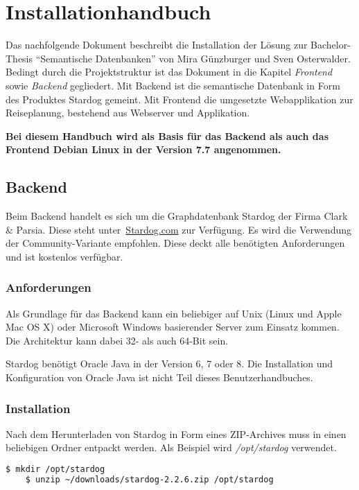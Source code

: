 \chapter{Installationhandbuch}
\label{chap:anh:ihb}
Das nachfolgende Dokument beschreibt die Installation der Lösung zur Bachelor-Thesis ``Semantische Datenbanken'' von Mira Günzburger und Sven Osterwalder. Bedingt durch die Projektstruktur ist das Dokument in die Kapitel \textit{Frontend} sowie \textit{Backend} gegliedert. Mit Backend ist die semantische Datenbank in Form des Produktes Stardog gemeint. Mit Frontend die umgesetzte Webapplikation zur Reiseplanung, bestehend aus Webserver und Applikation.

\textbf{Bei diesem Handbuch wird als Basis für das Backend als auch das Frontend Debian Linux in der Version 7.7 angenommen.}

\section{Backend}
\label{chap:anh:ihb:backend}
Beim Backend handelt es sich um die Graphdatenbank Stardog der Firma Clark \& Parsia. Diese steht unter~\href{http://www.stardog.com/#download}{Stardog.com} zur Verfügung. Es wird die Verwendung der Community-Variante empfohlen. Diese deckt alle benötigten Anforderungen und ist kostenlos verfügbar.

\subsection{Anforderungen}
\label{chap:anh:ihb:backend:req}
Als Grundlage für das Backend kann ein beliebiger auf Unix (Linux und Apple Mac OS X) oder Microsoft Windows basierender Server zum Einsatz kommen. Die Architektur kann dabei 32- als auch 64-Bit sein.

Stardog benötigt Oracle Java in der Version 6, 7 oder 8.
Die Installation und Konfiguration von Oracle Java ist nicht Teil dieses Benutzerhandbuches.

\subsection{Installation}
\label{chap:anh:ihb:backend:inst}
Nach dem Herunterladen von Stardog in Form eines ZIP-Archives muss in einen beliebigen Ordner entpackt werden. Als Beispiel wird \textit{/opt/stardog} verwendet.
\begin{lstlisting}[language=bash]
    $ mkdir /opt/stardog
    $ unzip ~/downloads/stardog-2.2.6.zip /opt/stardog
\end{lstlisting}

